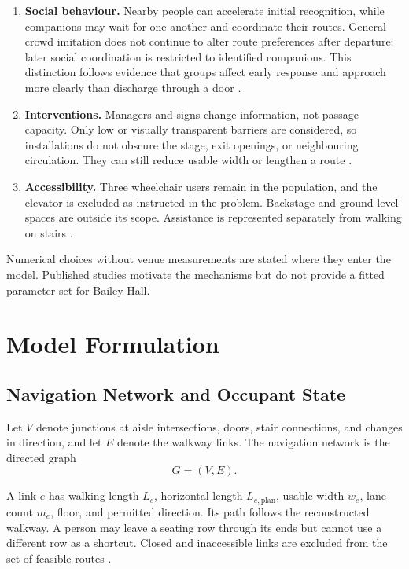 \documentclass[11pt,a4paper]{article}
\begin{document}
\begin{enumerate}[label=\arabic*.]
\item \textbf{Social behaviour.} Nearby people can accelerate initial recognition, while companions may wait for one another and coordinate their routes. General crowd imitation does not continue to alter route preferences after departure; later social coordination is restricted to identified companions. This distinction follows evidence that groups affect early response and approach more clearly than discharge through a door \cite{bode}.

\item \textbf{Interventions.} Managers and signs change information, not passage capacity. Only low or visually transparent barriers are considered, so installations do not obscure the stage, exit openings, or neighbouring circulation. They can still reduce usable width or lengthen a route \cite{feliciani,wang}.

\item \textbf{Accessibility.} Three wheelchair users remain in the population, and the elevator is excluded as instructed in the problem. Backstage and ground-level spaces are outside its scope. Assistance is represented separately from walking on stairs \cite{brief,mobility}.
\end{enumerate}

Numerical choices without venue measurements are stated where they enter the model. Published studies motivate the mechanisms but do not provide a fitted parameter set for Bailey Hall.

\section{Model Formulation}

\subsection{Navigation Network and Occupant State}

Let $V$ denote junctions at aisle intersections, doors, stair connections, and changes in direction, and let $E$ denote the walkway links. The navigation network is the directed graph
\begin{equation}\label{eq:graph}
G=(V,E).
\end{equation}

A link $e$ has walking length $L_e$, horizontal length $L_{e,\mathrm{plan}}$, usable width $w_e$, lane count $m_e$, floor, and permitted direction. Its path follows the reconstructed walkway. A person may leave a seating row through its ends but cannot use a different row as a shortcut. Closed and inaccessible links are excluded from the set of feasible routes \cite{spearpoint}.
\end{document}
